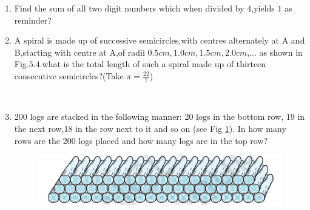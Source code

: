 \begin{enumerate}[label=\thechapter.\arabic*,ref=\thechapter.\theenumi]
\item Find the sum of all two digit numbers which when divided by $4$,yields $1$ as reminder?\\
\solution
\pagebreak

\item A spiral is made up of successive semicircles,with centres alternately at A and B,starting with centre at A,of radii $0.5cm,1.0cm,1.5cm,2.0cm$,... as shown in Fig.$5.4$.what is the total length of such a spiral made up of thirteen consecutive semicircles?(Take $\pi=\frac{22}{7}$)\\
\\
\solution
\pagebreak

\item 200 logs are stacked in the following manner: 20 logs in the bottom row, 19 in the next row,18 in the row next to it and so on (see Fig \ref{fig:10.5.3.19.q}). In how many rows are the 200 logs placed and how many logs are in the top row?
\begin{figure}[h]
    \centering
    \includegraphics[width=1\linewidth]{ncert-maths/10/5/3/19/figs/question.png}
    \caption{ }
    \label{fig:10.5.3.19.q}
\end{figure}
\solution 
\pagebreak


\end{enumerate}
